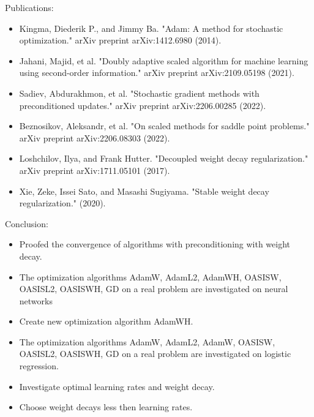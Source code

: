 \documentclass[aspectratio=169, 12pt]{beamer}
\begin{document}
\begin{frame}{Publications:}
    \begin{itemize}
        \item Kingma, Diederik P., and Jimmy Ba. "Adam: A method for stochastic optimization." arXiv preprint arXiv:1412.6980 (2014).
        \item Jahani, Majid, et al. "Doubly adaptive scaled algorithm for machine learning using second-order information." arXiv preprint arXiv:2109.05198 (2021).
        \item Sadiev, Abdurakhmon, et al. "Stochastic gradient methods with preconditioned updates." arXiv preprint arXiv:2206.00285 (2022).
        \item Beznosikov, Aleksandr, et al. "On scaled methods for saddle point problems." arXiv preprint arXiv:2206.08303 (2022).
        \item Loshchilov, Ilya, and Frank Hutter. "Decoupled weight decay regularization." arXiv preprint arXiv:1711.05101 (2017).
        \item Xie, Zeke, Issei Sato, and Masashi Sugiyama. "Stable weight decay regularization." (2020).
    \end{itemize}
\end{frame}

\begin{frame}{Conclusion:}
    \begin{itemize}
        \item Proofed the convergence of algorithms with preconditioning with weight decay.
        \item The optimization algorithms AdamW, AdamL2, AdamWH, OASISW, OASISL2, OASISWH, GD on a real problem are investigated on neural networks
        \item Create new optimization algorithm AdamWH.
        \item The optimization algorithms AdamW, AdamL2, AdamW, OASISW, OASISL2, OASISWH, GD on a real problem are investigated on logistic regression.
        \item Investigate optimal learning rates and weight decay.
        \item Choose weight decays less then learning rates.
    \end{itemize}
\end{frame}
\end{document}
